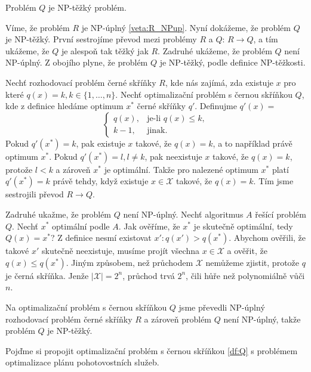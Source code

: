 \begin{veta}\label{veta:cernaSkrinkaNP}
  Problém $Q$ je NP-těžký problém.
\end{veta}

\begin{dukaz}
  Víme, že problém $R$ je NP-úplný \ref{veta:R_NPup}. Nyní dokážeme, že problém $Q$ je NP-těžký.
  První sestrojíme převod mezi problémy $R$ a $Q$: $R \rightarrow Q$, a tím ukážeme, že $Q$ je alespoň tak těžký jak $R$.
  Zadruhé ukážeme, že problém $Q$ není NP-úplný.
  Z obojího plyne, že problém $Q$ je NP-těžký, podle definice NP-těžkosti.

  Nechť rozhodovací problém černé skříňky $R$, kde nás zajímá, zda existuje $x$ pro které $q(x) = k, k \in \{ 1, \dots, n\}$. 
  Nechť optimalizační problém s černou skříňkou $Q$, kde z definice hledáme optimum $x^*$ černé skříňky $q'$.
  Definujme $q'(x) = $
  \[
  \begin{cases}
    q(x), & \text{je-li $q(x) \leq k$},\\
    k - 1, & \text{jinak}.
  \end{cases}
  \]
  Pokud $q'(x^*) = k$, pak existuje $x$ takové, že $q(x) = k$, a to například právě optimum $x^*$.
  Pokud $q'(x^*) = l, l \neq k$, pak neexistuje $x$ takové, že $q(x) = k$, protože $l < k$ a zároveň $x^*$ je optimální.
  Takže pro nalezené optimum $x^*$ platí $q'(x^*) = k$ právě tehdy, když existuje $x \in \mathcal{X}$ takové, že $q(x) = k$.
  Tím jsme sestrojili převod $R \rightarrow Q$.

  Zadruhé ukažme, že problém $Q$ není NP-úplný.
  Nechť algoritmus $A$ řešící problém $Q$.
  Nechť $x^*$ optimální podle $A$. Jak ověříme, že $x^*$ je skutečně optimální, tedy $Q(x) = x^*$?
  Z definice nesmí existovat $x' \colon q(x') > q(x^*)$.
  Abychom ověřili, že takové $x'$ skutečně neexistuje, musíme projít všechna $x \in \mathcal{X}$ a ověřit, že $q(x) \leq q(x^*)$.
  Jiným způsobem, než průchodem $\mathcal{X}$ nemůžeme zjistit, protože $q$ je černá skříňka.
  Jenže $|\mathcal{X}| = 2^n$, průchod trvá $2^n$, čili hůře než polynomiálně vůči $n$.

  Na optimalizační problém s černou skříňkou $Q$ jsme převedli NP-úplný rozhodovací problém černé skříňky $R$ a zároveň
  problém $Q$ není NP-úplný, takže problém $Q$ je NP-těžký.
\end{dukaz}

Pojďme si propojit optimalizační problém s černou skříňkou \ref{df:Q} s problémem optimalizace plánu pohotovostních služeb.

